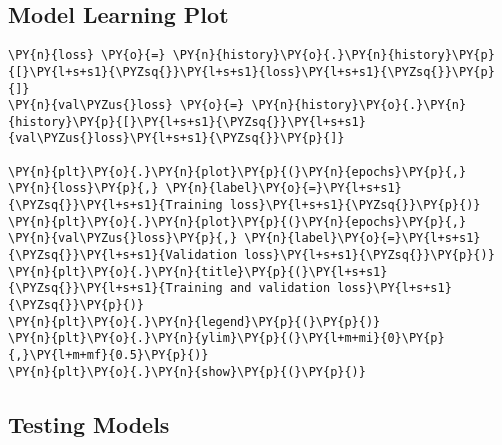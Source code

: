 \subsection{    Model Learning Plot
}
    \begin{tcolorbox}[breakable, size=fbox, boxrule=1pt, pad at break*=1mm,colback=cellbackground, colframe=cellborder]
\begin{Verbatim}[commandchars=\\\{\}]
\PY{n}{loss} \PY{o}{=} \PY{n}{history}\PY{o}{.}\PY{n}{history}\PY{p}{[}\PY{l+s+s1}{\PYZsq{}}\PY{l+s+s1}{loss}\PY{l+s+s1}{\PYZsq{}}\PY{p}{]}
\PY{n}{val\PYZus{}loss} \PY{o}{=} \PY{n}{history}\PY{o}{.}\PY{n}{history}\PY{p}{[}\PY{l+s+s1}{\PYZsq{}}\PY{l+s+s1}{val\PYZus{}loss}\PY{l+s+s1}{\PYZsq{}}\PY{p}{]}

\PY{n}{plt}\PY{o}{.}\PY{n}{plot}\PY{p}{(}\PY{n}{epochs}\PY{p}{,} \PY{n}{loss}\PY{p}{,} \PY{n}{label}\PY{o}{=}\PY{l+s+s1}{\PYZsq{}}\PY{l+s+s1}{Training loss}\PY{l+s+s1}{\PYZsq{}}\PY{p}{)}
\PY{n}{plt}\PY{o}{.}\PY{n}{plot}\PY{p}{(}\PY{n}{epochs}\PY{p}{,} \PY{n}{val\PYZus{}loss}\PY{p}{,} \PY{n}{label}\PY{o}{=}\PY{l+s+s1}{\PYZsq{}}\PY{l+s+s1}{Validation loss}\PY{l+s+s1}{\PYZsq{}}\PY{p}{)}
\PY{n}{plt}\PY{o}{.}\PY{n}{title}\PY{p}{(}\PY{l+s+s1}{\PYZsq{}}\PY{l+s+s1}{Training and validation loss}\PY{l+s+s1}{\PYZsq{}}\PY{p}{)}
\PY{n}{plt}\PY{o}{.}\PY{n}{legend}\PY{p}{(}\PY{p}{)}
\PY{n}{plt}\PY{o}{.}\PY{n}{ylim}\PY{p}{(}\PY{l+m+mi}{0}\PY{p}{,}\PY{l+m+mf}{0.5}\PY{p}{)}
\PY{n}{plt}\PY{o}{.}\PY{n}{show}\PY{p}{(}\PY{p}{)}
\end{Verbatim}
\end{tcolorbox}

\subsection{    Testing Models}

